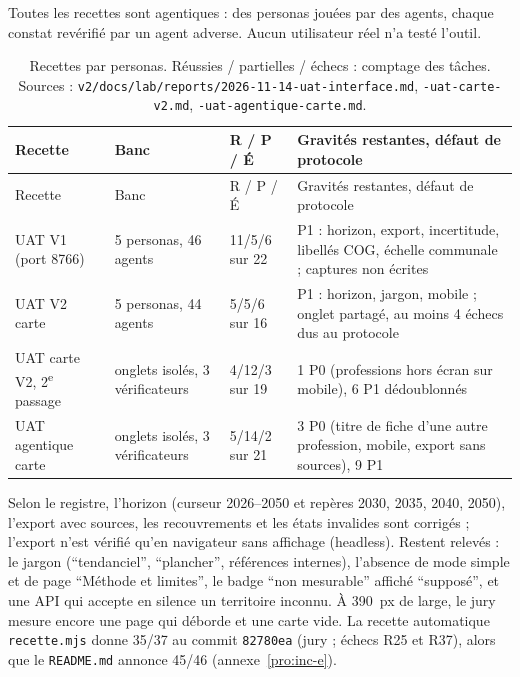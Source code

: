 Toutes les recettes sont agentiques : des personas jouées par des agents, chaque constat revérifié par un agent adverse. Aucun utilisateur réel n'a testé l'outil.

\begin{small}
\begin{longtable}{@{}p{}p{}p{}p{}@{}}
\caption{Recettes par personas. Réussies / partielles / échecs : comptage des tâches. Sources : \texttt{v2/\allowbreak{}docs/\allowbreak{}lab/\allowbreak{}reports/\allowbreak{}2026-\allowbreak{}11-\allowbreak{}14-\allowbreak{}uat-\allowbreak{}interface.md}, \texttt{-\allowbreak{}uat-\allowbreak{}carte-\allowbreak{}v2.md}, \texttt{-\allowbreak{}uat-\allowbreak{}agentique-\allowbreak{}carte.md}.}\label{pro:tab-uat}\\
\toprule Recette & Banc & R / P / É & Gravités restantes, défaut de protocole \\ \midrule\endfirsthead
\toprule Recette & Banc & R / P / É & Gravités restantes, défaut de protocole \\ \midrule\endhead
\bottomrule\endfoot
UAT V1 (port 8766) & 5\mesure{} personas, 46\mesure{} agents & 11/5/6\mesure{} sur 22 & P1 : horizon, export, incertitude, libellés COG, échelle communale ; captures non écrites \\
UAT V2 carte & 5\mesure{} personas, 44\mesure{} agents & 5/5/6\mesure{} sur 16 & P1 : horizon, jargon, mobile ; onglet partagé, au moins 4\mesure{} échecs dus au protocole \\
UAT carte V2, 2\textsuperscript{e} passage & onglets isolés, 3\mesure{} vérificateurs & 4/12/3\mesure{} sur 19 & 1\mesure{} P0 (professions hors écran sur mobile), 6\mesure{} P1 dédoublonnés \\
UAT agentique carte & onglets isolés, 3\mesure{} vérificateurs & 5/14/2\mesure{} sur 21 & 3\mesure{} P0 (titre de fiche d'une autre profession, mobile, export sans sources), 9\mesure{} P1 \\
\end{longtable}
\end{small}

Selon le registre, l'horizon (curseur 2026--2050 et repères 2030, 2035, 2040, 2050), l'export avec sources, les recouvrements et les états invalides sont corrigés ; l'export n'est vérifié qu'en navigateur sans affichage (headless).
Restent relevés : le jargon (\enquote{tendanciel}, \enquote{plancher}, références internes), l'absence de mode simple et de page \enquote{Méthode et limites}, le badge \enquote{non mesurable} affiché \enquote{supposé}, et une API qui accepte en silence un territoire inconnu. À 390\mesure{}~px de large, le jury mesure encore une page qui déborde et une carte vide.
La recette automatique \texttt{recette.mjs} donne 35/37\mesure{} au commit \texttt{82780ea} (jury ; échecs R25 et R37), alors que le \texttt{README.md} annonce 45/46 (annexe~\ref{pro:inc-e}).

